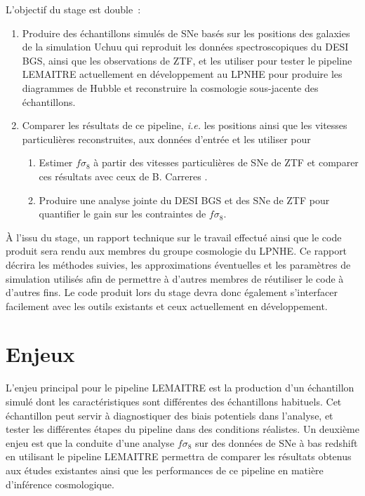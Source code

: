 \documentclass{article}
\begin{document}
L'objectif du stage est double~:
\begin{enumerate}
    \item Produire des échantillons simulés de SNe basés sur les positions des galaxies de la simulation Uchuu qui reproduit les données spectroscopiques du DESI BGS, ainsi que les observations de ZTF, et les utiliser pour tester le pipeline LEMAITRE actuellement en développement au LPNHE pour produire les diagrammes de Hubble et reconstruire la cosmologie sous-jacente des échantillons.
    \item Comparer les résultats de ce pipeline, \textit{i.e.} les positions ainsi que les vitesses particulières reconstruites, aux données d'entrée et les utiliser pour
    	\begin{enumerate}
		\item Estimer $f \sigma_8$ à partir des vitesses particulières de SNe de ZTF et comparer ces résultats avec ceux de B. Carreres \cite{carreres_growth-rate_2023}.
		\item Produire une analyse jointe du DESI BGS et des SNe de ZTF pour quantifier le gain sur les contraintes de $f\sigma_8$.
	\end{enumerate}
\end{enumerate}

À l'issu du stage, un rapport technique sur le travail effectué ainsi que le code produit sera rendu aux membres du groupe cosmologie du LPNHE. Ce rapport décrira les méthodes suivies, les approximations éventuelles et les paramètres de simulation utilisés afin de permettre à d'autres membres de réutiliser le code à d'autres fins. Le code produit lors du stage devra donc également s'interfacer facilement avec les outils existants et ceux actuellement en développement.

\section{Enjeux}


L'enjeu principal pour le pipeline LEMAITRE est la production d'un échantillon simulé dont les caractéristiques sont différentes des échantillons habituels. Cet échantillon peut servir à diagnostiquer des biais potentiels dans l'analyse, et tester les différentes étapes du pipeline dans des conditions réalistes. Un deuxième enjeu est que la conduite d'une analyse $f\sigma_8$ sur des données de SNe à bas redshift en utilisant le pipeline LEMAITRE permettra de comparer les résultats obtenus aux études existantes ainsi que les performances de ce pipeline en matière d'inférence cosmologique.
\end{document}
